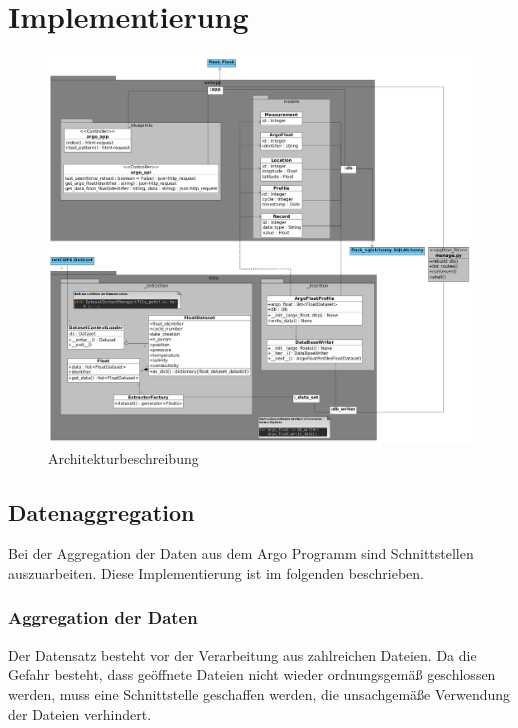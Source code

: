 \section{Implementierung}

\begin{figure}[h]
 \centering
 \includegraphics[width=\textwidth]{pix/Modulschema_komplett.png}
 \caption{Architekturbeschreibung}
 \label{fig:modulschema}
\end{figure}


\subsection{Datenaggregation}

Bei der Aggregation der Daten aus dem Argo Programm sind Schnittstellen auszuarbeiten. Diese Implementierung ist im folgenden beschrieben. 

\subsubsection{Aggregation der Daten}

Der Datensatz besteht vor der Verarbeitung aus zahlreichen Dateien. Da die Gefahr besteht, dass geöffnete Dateien nicht wieder ordnungsgemäß geschlossen werden, muss eine Schnittstelle geschaffen werden, die unsachgemäße Verwendung der Dateien verhindert. 

